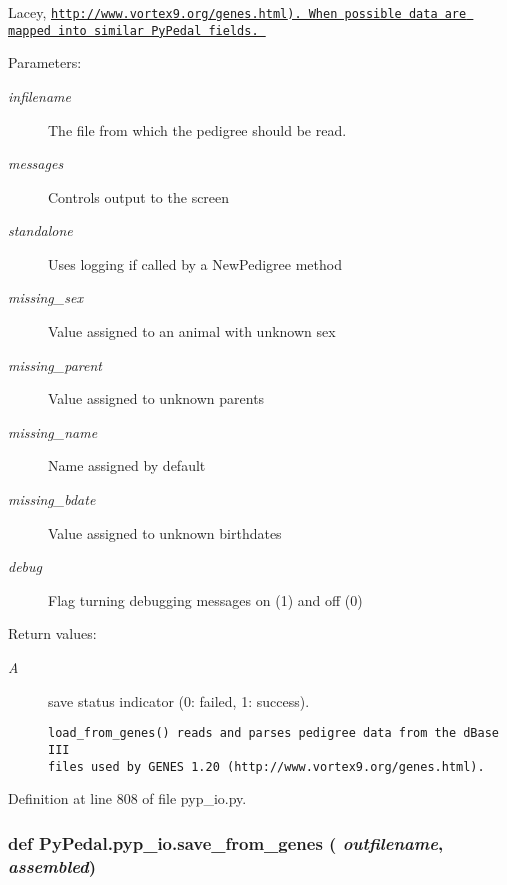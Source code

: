 Lacey, \href{http://www.vortex9.org/genes.html}\tt{http://www.vortex9.org/genes.html}). When possible data are mapped into similar Py\-Pedal fields. \begin{Desc}
\item[Parameters:]
\begin{description}
\item[{\em infilename}]The file from which the pedigree should be read. \item[{\em messages}]Controls output to the screen \item[{\em standalone}]Uses logging if called by a New\-Pedigree method \item[{\em missing\_\-sex}]Value assigned to an animal with unknown sex \item[{\em missing\_\-parent}]Value assigned to unknown parents \item[{\em missing\_\-name}]Name assigned by default \item[{\em missing\_\-bdate}]Value assigned to unknown birthdates \item[{\em debug}]Flag turning debugging messages on (1) and off (0) \end{description}
\end{Desc}
\begin{Desc}
\item[Return values:]
\begin{description}
\item[{\em A}]save status indicator (0: failed, 1: success).

\footnotesize\begin{verbatim}load_from_genes() reads and parses pedigree data from the dBase III
files used by GENES 1.20 (http://www.vortex9.org/genes.html).
\end{verbatim}
\normalsize
 \end{description}
\end{Desc}


Definition at line 808 of file pyp\_\-io.py.\hypertarget{namespacePyPedal_1_1pyp__io_ad4bb26c9f774a572fb64300db6cdbfb}{
\subsubsection[save\_\-from\_\-genes]{\setlength{\rightskip}{0pt plus 5cm}def Py\-Pedal.pyp\_\-io.save\_\-from\_\-genes ( {\em outfilename},  {\em assembled})}}
\label{namespacePyPedal_1_1pyp__io_ad4bb26c9f774a572fb64300db6cdbfb}


